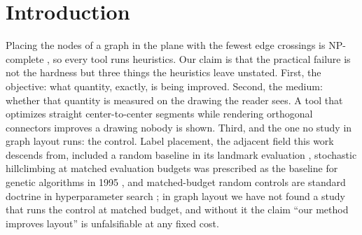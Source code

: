 \documentclass[11pt]{article}
\begin{document}
\section{Introduction}

Placing the nodes of a graph in the plane
with the fewest edge crossings is NP-complete \cite{gj83}, so every tool runs heuristics.
Our claim is that the practical failure is not the hardness but three things the heuristics
leave unstated. First, the objective: what quantity, exactly, is being improved. Second,
the medium: whether that quantity is measured on the drawing the reader sees. A tool that
optimizes straight center-to-center segments while rendering orthogonal connectors improves
a drawing nobody is shown. Third, and the one no study in graph layout runs: the control.
Label placement, the adjacent field this work descends from, included a random baseline in
its landmark evaluation \cite{cms95}, stochastic hillclimbing at matched evaluation budgets
was prescribed as the baseline for genetic algorithms in 1995 \cite{jw95}, and
matched-budget random controls are standard
doctrine in hyperparameter search \cite{bergstra12}; in graph layout we have not found a
study that runs the control at matched budget, and without it the claim ``our method
improves layout'' is unfalsifiable at any fixed cost.
\end{document}
